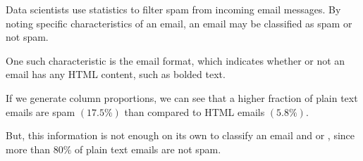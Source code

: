 \documentclass[handout]{beamer}
\begin{document}
\begin{frame}
\begin{example}\label{spam email}
\vspace{-2mm}%
Data scientists use statistics to filter spam from incoming email messages. By noting specific characteristics of an email, an email may be classified as spam or not spam.\pause

\vspace{1mm}
One such characteristic is the email format, which indicates whether or not an email has any HTML content, such as bolded text. 
%
\pause

If we generate column proportions, we can see that a higher fraction of plain text emails are spam $\left(17.5\%\right)$ than compared to HTML emails $\left(5.8\%\right)$.\pause

\vspace{2mm}
But, this information is not enough on its own to classify an email and  or , since more than $80\%$ of plain text emails are not spam.
\end{example}
\end{frame}
\end{document}
